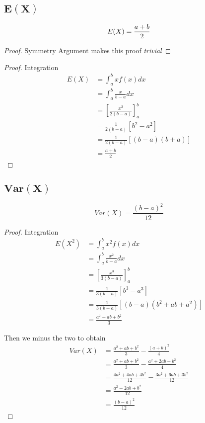 \documentclass[12pt]{article}
\begin{document}
\subsection{$\bm{E(X)}$}

\begin{equation*}
  E(X) = \frac{a+b}{2} \\
\end{equation*}

\begin{proof}
  Symmetry Argument makes this proof \emph{trivial}
\end{proof}

\begin{proof} Integration
  \begin{align*}
    E(X) &= \int_{a}^{b} x f(x) dx \\
         &= \int_{a}^{b} \frac{x}{b-a} dx \\
         &= \left[\frac{x^{2}}{2(b-a)}\right]_{a}^{b} \\
         &= \frac{1}{2(b-a)}[b^{2}-a^{2}] \\
         &= \frac{1}{2(b-a)}[(b-a)(b+a)] \\
         &= \frac{a+b}{2}
  \end{align*}
\end{proof}

\subsection{$\bm{Var(X)}$}

\begin{equation*}
  Var(X)= \frac{(b-a)^{2}}{12}
\end{equation*}
\begin{proof} Integration
  \begin{align*}
    E(X^{2}) &= \int_{a}^{b} x^{2} f(x) dx \\
         &= \int_{a}^{b} \frac{x^{2}}{b-a} dx \\
         &= \left[\frac{x^{3}}{3(b-a)}\right]_{a}^{b} \\
         &= \frac{1}{3(b-a)}[b^{3}-a^{3}] \\
         &= \frac{1}{3(b-a)}[(b-a)(b^{2}+ab+a^{2})] \\
         &= \frac{a^{2}+ab+b^{2}}{3}
  \end{align*}

  Then we minus the two to obtain
  \begin{align*}
    Var(X) &= \frac{a^{2}+ab+b^{2}}{3} - \frac{(a+b)^{2}}{4} \\
           &= \frac{a^{2}+ab+b^{2}}{3} - \frac{a^{2}+2ab+b^{2}}{4} \\
           &= \frac{4a^{2}+4ab+4b^{2}}{12} - \frac{3a^{2}+6ab+3b^{2}}{12} \\
           &= \frac{a^{2}-2ab+b^{2}}{12} \\
           &= \frac{(b-a)^{2}}{12}
  \end{align*}
\end{proof}
\end{document}
